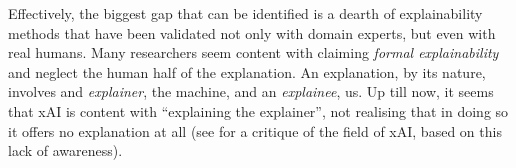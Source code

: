 Effectively, the biggest gap that can be identified is a dearth of explainability methods that have been validated not only with domain experts, but even with real humans.
Many researchers seem content with claiming \textit{formal explainability} and neglect the human half of the explanation.
An explanation, by its nature, involves and \textit{explainer}, the machine, and an \textit{explainee}, us.
Up till now, it seems that xAI is content with \enquote{explaining the explainer}, not realising that in doing so it offers no explanation at all (see \citet{mittelstadt2019explaining} for a critique of the field of xAI, based on this lack of awareness).